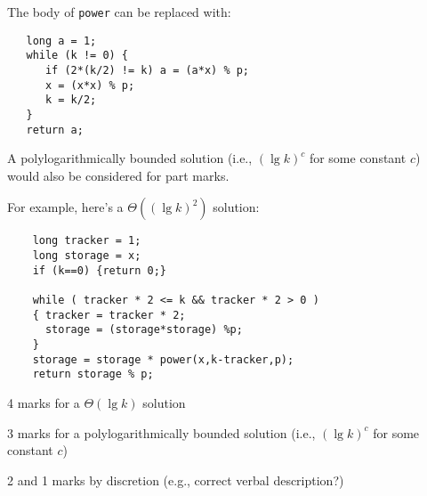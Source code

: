 \begin{solution}
   The body of {\tt power} can be replaced with:
\begin{verbatim}
   long a = 1;
   while (k != 0) {
      if (2*(k/2) != k) a = (a*x) % p;
      x = (x*x) % p;
      k = k/2;
   }
   return a;
\end{verbatim}

   
 A polylogarithmically bounded solution (i.e., $(\lg k)^c$
 for some constant $c$) would also be considered for part marks.

 For example, here's a $\Theta( (\lg k)^2 )$ solution:

\begin{verbatim}
    long tracker = 1;
    long storage = x;
    if (k==0) {return 0;}

    while ( tracker * 2 <= k && tracker * 2 > 0 )
    { tracker = tracker * 2;
      storage = (storage*storage) %p;
    }
    storage = storage * power(x,k-tracker,p);
    return storage % p;
\end{verbatim}

\end{solution}

\begin{markingScheme}
  4 marks for a $\Theta(\lg k)$ solution

  3 marks for a polylogarithmically bounded solution (i.e., $(\lg k)^c$
 for some constant $c$)

  2 and 1 marks by discretion (e.g., correct verbal description?)
\end{markingScheme}
